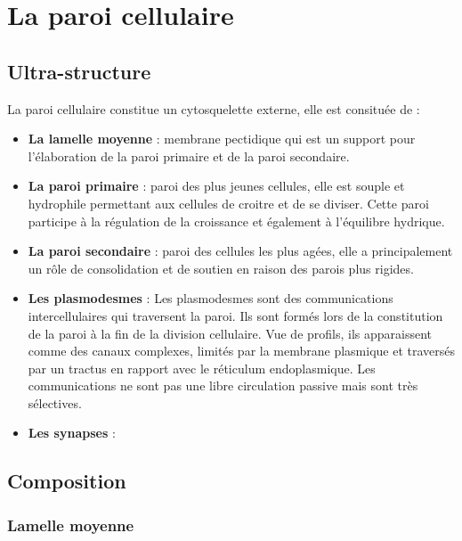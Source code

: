 \documentclass[
]{book}
\providecommand{\tightlist}{%
  \setlength{\itemsep}{0pt}\setlength{\parskip}{0pt}}
\begin{document}
\hypertarget{la-paroi-cellulaire}{%
\section{La paroi cellulaire}\label{la-paroi-cellulaire}}

\hypertarget{ultra-structure}{%
\subsection{Ultra-structure}\label{ultra-structure}}

La paroi cellulaire constitue un cytosquelette externe, elle est consituée de :

\begin{itemize}
\tightlist
\item
  \textbf{La lamelle moyenne} : membrane pectidique qui est un support pour l'élaboration de la paroi primaire et de la paroi secondaire.
\item
  \textbf{La paroi primaire} : paroi des plus jeunes cellules, elle est souple et hydrophile permettant aux cellules de croitre et de se diviser. Cette paroi participe à la régulation de la croissance et également à l'équilibre hydrique.
\item
  \textbf{La paroi secondaire} : paroi des cellules les plus agées, elle a principalement un rôle de consolidation et de soutien en raison des parois plus rigides.
\item
  \textbf{Les plasmodesmes} : Les plasmodesmes sont des communications intercellulaires qui traversent la paroi. Ils sont formés lors de la constitution de la paroi à la fin de la division cellulaire. Vue de profils, ils apparaissent comme des canaux complexes, limités par la membrane plasmique et traversés par un tractus en rapport avec le réticulum endoplasmique. Les communications ne sont pas une libre circulation passive mais sont très sélectives.
\item
  \textbf{Les synapses} :
\end{itemize}

\hypertarget{composition}{%
\subsection{Composition}\label{composition}}

\hypertarget{lamelle-moyenne}{%
\subsubsection{Lamelle moyenne}\label{lamelle-moyenne}}
\end{document}
